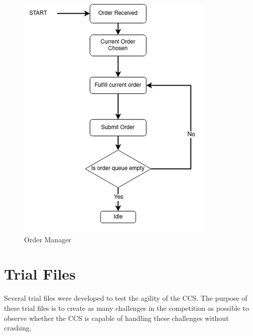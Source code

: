 \documentclass{uva-inf-article}
\begin{document}
\begin{figure}[h]
    \centering
    \includegraphics[scale=0.75]{images/order_manager.png}
    \caption{Order Manager}
    \label{fig:ordMgr}
\end{figure}



\justifying
\section{Trial Files}
\noindent Several trial files were developed to test the agility of the CCS. The purpose of these trial files is to create as many challenges in the competition as possible to observe whether the CCS is capable of handling these challenges without crashing. \\
\end{document}
